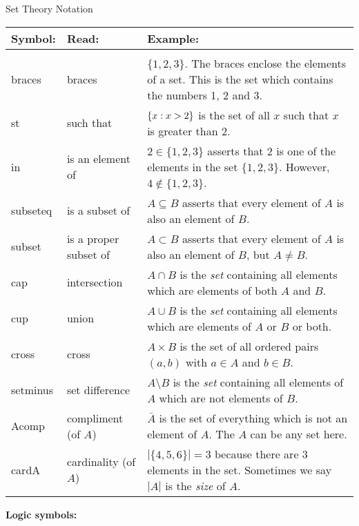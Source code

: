 \documentclass[12pt]{article}
\begin{document}
\begin{defbox}{Set Theory Notation}
\noindent  \begin{tabular}{p{.65in} p{1.35in} p{3.1in}}
    Symbol: & Read: & Example: \\ \hline \\
    \gls{braces} & braces & $\{1,2,3\}$.  The braces enclose the elements of a set.  This is the set which contains the numbers 1, 2 and 3.\\[1ex]
    \gls{st} & such that & $\{x : x > 2\}$ is the set of all $x$ such that $x$ is greater than 2.\\[1ex]
    \gls{in} & is an element of & $2 \in \{1,2,3\}$ asserts that 2 is one of the elements in the set $\{1,2,3\}$.  However, $4 \notin\{1,2,3\}$.\\[1ex]
    \gls{subseteq} & is a subset of & $A \subseteq B$ asserts that every element of $A$ is also an element of $B$.\\[1ex]
    \gls{subset} & is a proper subset of & $A \subset B$ asserts that every element of $A$ is also an element of $B$, but $A \ne B$.\\[1ex]
    \gls{cap} & intersection\index{intersection} & $A \cap B$ is the \emph{set} containing all elements which are elements of both $A$ and $B$.\\[1ex]
    \gls{cup} & union\index{union} & $A \cup B$ is the \emph{set} containing all elements which are elements of $A$ or $B$ or both.\\[1ex]
    \gls{cross} & cross & $A \times B$ is the set of all ordered pairs $(a,b)$ with $a \in A$ and $b \in B$. \\[1ex]
    \gls{setminus} & set difference & $A \setminus B$ is the \emph{set} containing all elements of $A$ which are not elements of $B$.\\[1ex]
    \gls{Acomp} & compliment (of $A$) & $\bar A$ is the set of everything which is not an element of $A$.  The $A$ can be any set here.\\[1ex]
    \gls{cardA} & cardinality\index{cardinality} (of $A$)& $|\{4,5,6\}| = 3$ because there are 3 elements in the set.  Sometimes we say $|A|$ is the \emph{size} of $A$.\\[1ex]
\end{tabular}

\noindent\textbf{Logic symbols:}\\
\noindent  \begin{tabular}{p{.65in} p{1.35in} p{3.1in}}


\end{tabular}
\end{defbox}
\end{document}
